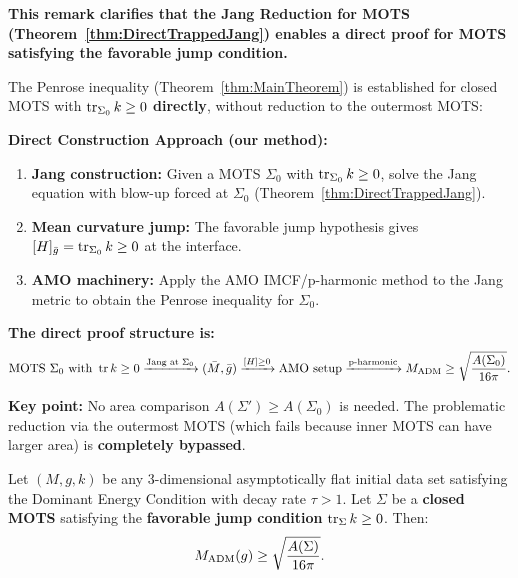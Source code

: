 \begin{remark}\label{rem:ReductionLogicSound}
\textbf{This remark clarifies that the Jang Reduction for MOTS (Theorem~\ref{thm:DirectTrappedJang}) enables a direct proof for MOTS satisfying the favorable jump condition.}

The Penrose inequality (Theorem~\ref{thm:MainTheorem}) is established for closed MOTS with $\operatorname{tr}_{\Sigma_0} k \ge 0$ \textbf{directly}, without reduction to the outermost MOTS:

\textbf{Direct Construction Approach (our method):}
\begin{enumerate}
    \item \textbf{Jang construction:} Given a MOTS $\Sigma_0$ with $\operatorname{tr}_{\Sigma_0} k \ge 0$, solve the Jang equation with blow-up forced at $\Sigma_0$ (Theorem~\ref{thm:DirectTrappedJang}).
    
    \item \textbf{Mean curvature jump:} The favorable jump hypothesis gives $[H]_{\bar{g}} = \operatorname{tr}_{\Sigma_0} k \ge 0$ at the interface.
    
    \item \textbf{AMO machinery:} Apply the AMO IMCF/p-harmonic method to the Jang metric to obtain the Penrose inequality for $\Sigma_0$.
\end{enumerate}

\textbf{The direct proof structure is:}
\begin{equation*}
\text{MOTS } \Sigma_0 \text{ with } \operatorname{tr} k \ge 0 \xrightarrow{\text{Jang at } \Sigma_0} (\bar{M}, \bar{g}) \xrightarrow{[H] \ge 0} \text{AMO setup} \xrightarrow{\text{p-harmonic}} M_{\mathrm{ADM}} \ge \sqrt{\frac{A(\Sigma_0)}{16\pi}}.
\end{equation*}

\textbf{Key point:} No area comparison $A(\Sigma') \ge A(\Sigma_0)$ is needed. The problematic reduction via the outermost MOTS (which fails because inner MOTS can have larger area) is \textbf{completely bypassed}.
\end{remark}

\begin{corollary}\label{cor:FinalUnconditional}
Let $(M, g, k)$ be any 3-dimensional asymptotically flat initial data set satisfying the Dominant Energy Condition with decay rate $\tau > 1$. Let $\Sigma$ be a \textbf{closed MOTS} satisfying the \textbf{favorable jump condition} $\operatorname{tr}_\Sigma k \ge 0$. Then:
\begin{equation}
    M_{\mathrm{ADM}}(g) \ge \sqrt{\frac{A(\Sigma)}{16\pi}}.
\end{equation}
\end{corollary}

